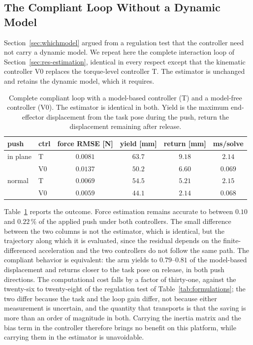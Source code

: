 \documentclass{ieeeaccess}
\begin{document}
\subsection{The Compliant Loop Without a Dynamic Model}
\label{sec:res-model}
Section~\ref{sec:whichmodel} argued from a regulation test that the controller need
not carry a dynamic model. We repeat here the complete interaction loop of
Section~\ref{sec:res-estimation}, identical in every respect except that the
kinematic controller V0 replaces the torque-level controller T. The estimator is
unchanged and retains the dynamic model, which it requires.

\begin{table}[!t]
\caption{Complete compliant loop with a model-based controller (T) and a
model-free controller (V0). The estimator is identical in both. Yield is the
maximum end-effector displacement from the task pose during the push, return the
displacement remaining after release.}
\label{tab:v0loop}
\centering
\footnotesize
\setlength{\tabcolsep}{4pt}
\begin{tabular}{llcccc}
\toprule
push & ctrl & force RMSE [N] & yield [mm] & return [mm] & ms/solve\\
\midrule
in plane & T  & $0.0081$ & $63.7$ & $9.18$ & $2.14$\\
         & V0 & $0.0137$ & $50.2$ & $\bm{6.60}$ & $\bm{0.069}$\\
\midrule
normal   & T  & $0.0069$ & $54.5$ & $5.21$ & $2.15$\\
         & V0 & $0.0059$ & $44.1$ & $\bm{2.14}$ & $\bm{0.068}$\\
\bottomrule
\end{tabular}
\end{table}

Table~\ref{tab:v0loop} reports the outcome. Force estimation remains accurate to
between $0.10$ and $0.22\,\%$ of the applied push under both controllers. The
small difference between the two columns is not the estimator, which is identical,
but the trajectory along which it is evaluated, since the residual depends on the
finite-differenced acceleration and the two controllers do not follow the same
path. The compliant behavior is equivalent: the arm yields to $0.79$--$0.81$ of
the model-based displacement and returns closer to the task pose on release, in
both push directions. The computational cost falls by a factor of thirty-one,
against the twenty-six to twenty-eight of the regulation test of
Table~\ref{tab:formulations}; the two differ because the task and the loop gain
differ, not because either measurement is uncertain, and the quantity that
transports is that the saving is more than an order of magnitude in both.
Carrying the inertia matrix and the bias term in the controller therefore brings
no benefit on this platform, while carrying them in the estimator is unavoidable.
\end{document}
